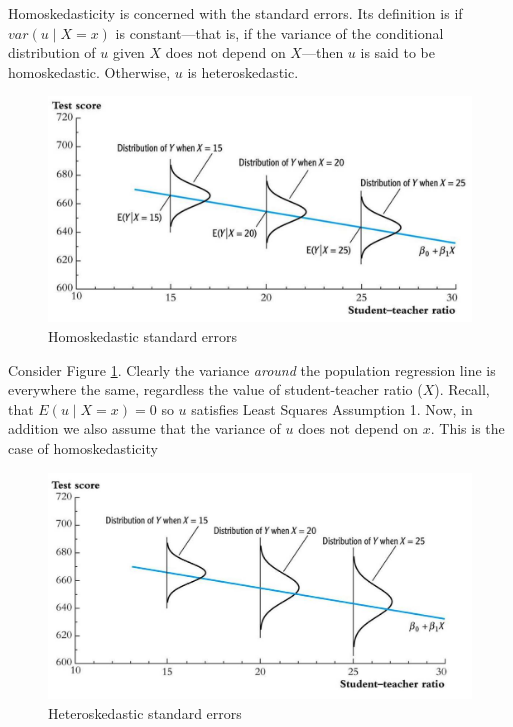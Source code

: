\documentclass[
]{book}
\begin{document}
Homoskedasticity is concerned with the standard errors. Its definition is if \(var(u \mid X=x)\) is constant---that is, if the variance of the conditional distribution of \(u\) given \(X\) does not depend on \(X\)---then \(u\) is said to be homoskedastic. Otherwise, \(u\) is heteroskedastic.

\begin{figure}

{\centering \includegraphics[width=600px]{./figures/Sheet21} 

}

\caption{Homoskedastic standard errors}\label{fig:homoskedasticity}
\end{figure}

Consider Figure \ref{fig:homoskedasticity}. Clearly the variance \emph{around} the population regression line is everywhere the same, regardless the value of student-teacher ratio (\(X\)). Recall, that \(E(u \mid X=x) = 0\) so \(u\) satisfies Least Squares Assumption 1. Now, in addition we also assume that the variance of \(u\) does not depend on \(x\). This is the case of homoskedasticity

\begin{figure}

{\centering \includegraphics[width=600px]{./figures/Sheet22} 

}

\caption{Heteroskedastic standard errors}\label{fig:heteroskedasticity}
\end{figure}
\end{document}
